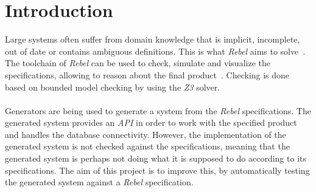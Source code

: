 \chapter{Introduction}
\label{chp:intro}
Large systems often suffer from domain knowledge that is implicit, incomplete,
out of date or contains ambiguous definitions. This is what \textit{Rebel} aims
to solve~\cite{stoel2016solving}. The toolchain of \textit{Rebel} can be used to
check, simulate and visualize the specifications, allowing to reason about the
final product~\cite{stoel2015case}. Checking is done based on bounded model checking
by using the \textit{Z3} solver.\\
\\
Generators are being used to generate a system from the \textit{Rebel}
specifications. The generated system provides an \textit{API} in order to work with the
specified product and handles the database connectivity. However, the
implementation of the generated system is not checked against the
specifications, meaning that the generated system is perhaps not doing what it
is supposed to do according to its specifications. The aim of this project is to
improve this, by automatically testing the generated system against a
\textit{Rebel} specification.

